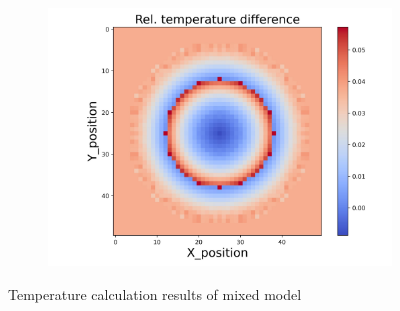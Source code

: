 \begin{figure}[h]
\begin{minipage}{\textwidth}
\begin{subfigure}{0.325\textwidth}
            \centering
            \includegraphics[width=\textwidth]{figures/raw_data/33/linear/T_bias.jpg}
        \end{subfigure}
    \end{minipage}
    \caption{Temperature calculation results of mixed model}  
\end{figure}
